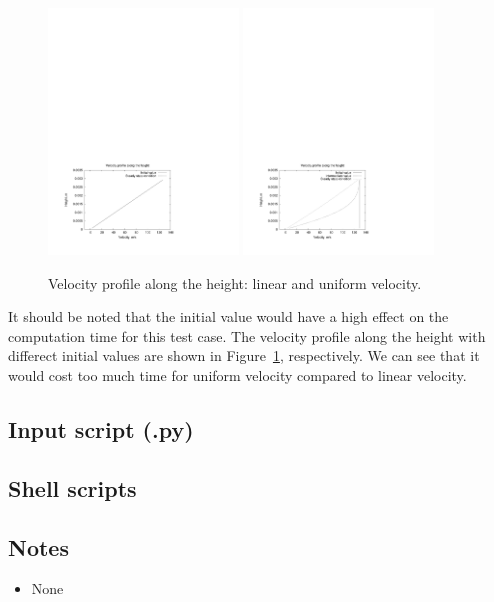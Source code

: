 \begin{figure}[htbp]
\begin{center}
\includegraphics[width=0.45\textwidth,viewport=39 52 414 298,clip=true]{../3D/couette-flow/c_3D_linear.pdf}
\includegraphics[width=0.45\textwidth,viewport=39 52 414 298,clip=true]{../3D/couette-flow/c_3D_uniform.pdf}
\end{center}
\caption{Velocity profile along the height: linear and uniform velocity.}
   \label{couette3-linearuniform-fig}
\end{figure}

\medskip
It should be noted that the initial value would have a high effect on the computation time 
for this test case. The velocity profile along the height with differect initial values are 
shown in Figure~\ref{couette3-linearuniform-fig}, respectively. We can see that it would cost too much time for
uniform velocity compared to linear velocity.

\newpage
\subsection{Input script (.py)}
\topbar

\bottombar


\subsection{Shell scripts}
\label{couette-flow-2D-sh-files}
\topbar

\bottombar

\subsection{Notes}
\begin{itemize}
\item None
\end{itemize}


